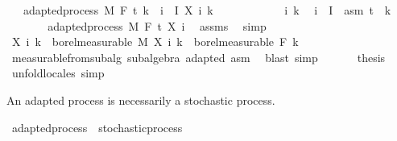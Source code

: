 \begin{isabellebody}
\ \ \ {\isachardoublequoteopen}adapted{\isacharunderscore}{\kern0pt}process\ M\ F\ t\ {\isacharparenleft}{\kern0pt}{\isasymlambda}k\ {\isasymxi}{\isachardot}{\kern0pt}\ {\isasymSum}i\ {\isasymin}\ I{\isachardot}{\kern0pt}\ X\ i\ k\ {\isasymxi}{\isacharparenright}{\kern0pt}{\isachardoublequoteclose}\ \isanewline
%
\isadelimproof
%
\endisadelimproof
%
\isatagproof
{}\isamarkupfalse%
\ {\isacharminus}{\kern0pt}\isanewline
\ \ \isacommand{{\isacharbraceleft}{\kern0pt}}\isamarkupfalse%
\isanewline
\ \ \ \ \isamarkupfalse%
\ i\ k\ \isamarkupfalse%
\ {\isachardoublequoteopen}i\ {\isasymin}\ I{\isachardoublequoteclose}\ \ asm{\isacharcolon}{\kern0pt}\ {\isachardoublequoteopen}t\ {\isasymle}\ k{\isachardoublequoteclose}\isanewline
\ \ \ \ \isamarkupfalse%
\ \isamarkupfalse%
\ adapted{\isacharunderscore}{\kern0pt}process\ M\ F\ t\ {\isachardoublequoteopen}X\ i{\isachardoublequoteclose}\ \isamarkupfalse%
\ assms\ \isamarkupfalse%
\ simp\isanewline
\ \ \ \ \isamarkupfalse%
\ {\isachardoublequoteopen}X\ i\ k\ {\isasymin}\ borel{\isacharunderscore}{\kern0pt}measurable\ M{\isachardoublequoteclose}\ {\isachardoublequoteopen}X\ i\ k\ {\isasymin}\ borel{\isacharunderscore}{\kern0pt}measurable\ {\isacharparenleft}{\kern0pt}F\ k{\isacharparenright}{\kern0pt}{\isachardoublequoteclose}\ \isamarkupfalse%
\ measurable{\isacharunderscore}{\kern0pt}from{\isacharunderscore}{\kern0pt}subalg\ subalgebra\ adapted\ asm\ \isamarkupfalse%
\ {\isacharparenleft}{\kern0pt}blast{\isacharcomma}{\kern0pt}\ simp{\isacharparenright}{\kern0pt}\isanewline
\ \ \isacommand{{\isacharbraceright}{\kern0pt}}\isamarkupfalse%
\isanewline
\ \ \isamarkupfalse%
\ {\isacharquery}{\kern0pt}thesis\ \isamarkupfalse%
\ {\isacharparenleft}{\kern0pt}unfold{\isacharunderscore}{\kern0pt}locales{\isacharparenright}{\kern0pt}\ simp\isanewline
{}\isamarkupfalse%
%
\endisatagproof
{\isafoldproof}%
%
\isadelimproof
%
\endisadelimproof
%
\begin{isamarkuptext}%
An adapted process is necessarily a stochastic process.%
\end{isamarkuptext}\isamarkuptrue%
\isamarkupfalse%
\ adapted{\isacharunderscore}{\kern0pt}process\ {\isasymsubseteq}\ stochastic{\isacharunderscore}{\kern0pt}process%
\isadelimproof
\ %

\end{isabellebody}
